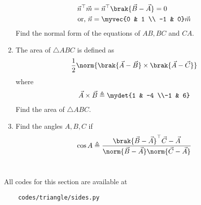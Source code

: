 \begin{enumerate}[label=\thesubsection.\arabic*.,ref=\thesubsection.\theenumi]
		\begin{align}
			\vec{n}^{\top}\vec{m}&=\vec{n}^{\top}\brak{\vec{B}-\vec{A}} = 0
			\\
			\text{or, } \vec{n}&=\myvec{0 & 1 \\ -1 & 0} \vec{m}
			\label{eq:geo-norm-vec}
		\end{align}
Find the normal form of the equations of $AB, BC$ and $CA$.
\\
\solution

\item The area of $\triangle ABC$ is defined as
		\begin{align}
			\frac{1}{2}\norm{{\brak{\vec{A}-\vec{B}}\times \brak{\vec{A}-\vec{C}}}}
		\end{align}
		where
		\begin{align}
			\vec{A}\times\vec{B} \triangleq \mydet{1 & -4 \\-1 & 6}
		\end{align}
		Find the area of $\triangle ABC$.\\
  		
	\item Find the angles $A, B, C$ if 
    \label{prop:angle2d}
  \begin{align}
    \label{eq:angle2d}
			\cos A \triangleq 
\frac{\brak{\vec{B}-\vec{A}}^{\top}{\vec{C}-\vec{A}}}{\norm{\vec{B}-\vec{A}}\norm{\vec{C}-\vec{A}}}
  \end{align}\\
  	
\end{enumerate}
All codes for this section are available at
\begin{lstlisting}
	codes/triangle/sides.py
\end{lstlisting}
